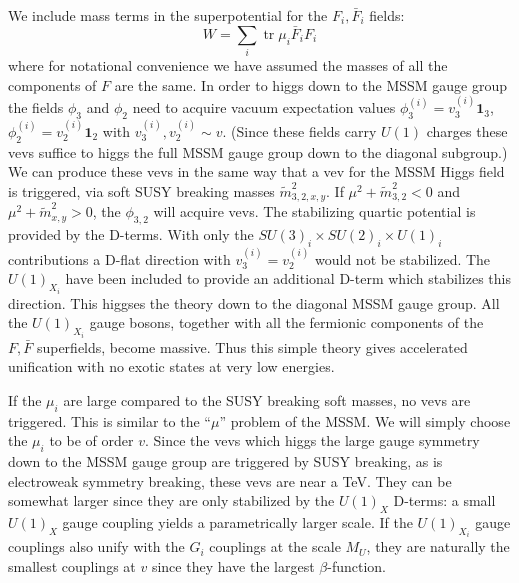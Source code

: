 \documentclass[a4paper,prl,twocolumn]{revtex4}
\newcommand{\tr}{\operatorname{tr}}
\begin{document}
We include mass terms in the
superpotential for the $F_i, {\bar F}_i$ fields:
\begin{equation}
  \label{eq:7}
  W = \sum_i \tr \mu_i {\bar F}_i F_i
\end{equation}
where for notational convenience we have assumed the masses of all the
components of $F$ are the same. 
In order to higgs down to the MSSM gauge group the fields $\phi_3$ and
$\phi_2$ need to acquire vacuum expectation values $\phi_3^{(i)} =
v_3^{(i)} \mathbf{1}_3$, $\phi_2^{(i)} = v_2^{(i)} \mathbf{1}_2$ with
$v_3^{(i)}, v_2^{(i)}\sim v$.  (Since these fields carry $U(1)$ charges
these vevs suffice to higgs the full MSSM gauge group down to the
diagonal subgroup.)  We can produce these vevs in the same way that a
vev for the MSSM Higgs field is triggered, via soft SUSY breaking
masses ${\tilde m_{3,2,x,y}^2}$.  If $\mu^2 + {\tilde m_{3,2}^2} < 0$
and $\mu^2 + {\tilde m_{x,y}^2} > 0$, the $\phi_{3,2}$ will acquire
vevs. The stabilizing quartic potential is provided by the D-terms.
With only the $SU(3)_i\times SU(2)_i\times U(1)_i$ contributions a
D-flat direction with $v_3^{(i)}=v_2^{(i)}$ would not be
stabilized. The $U(1)_{X_i}$ 
have been included to provide an additional D-term which stabilizes
this direction. 
This higgses the theory down to the diagonal MSSM gauge group.
All the $U(1)_{X_i}$ gauge bosons, together with all the fermionic
components of the $F, {\bar F}$ superfields, become massive.  Thus
this simple theory gives accelerated unification with no exotic states
at very low energies.  

If the  $\mu_i$ are  large compared to the SUSY breaking soft masses,
no vevs are triggered. This is similar to the ``$\mu$'' problem of the
MSSM. We will simply choose the $\mu_i$ to be of order $v$.
Since the vevs which higgs the large gauge symmetry down to the MSSM
gauge group are triggered by SUSY breaking, as is electroweak symmetry
breaking, these vevs are near a TeV. They can be somewhat
larger since they are only stabilized by the $U(1)_X$ D-terms: a small
$U(1)_X$ gauge coupling yields a parametrically larger scale.
If the $U(1)_{X_i}$ gauge couplings also unify with the $G_i$
couplings at the scale $M_U$, they are naturally the smallest
couplings at $v$ since they have the largest $\beta$-function.
\end{document}
